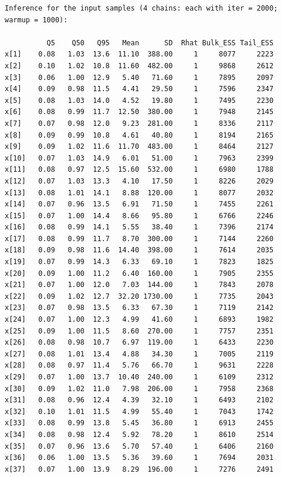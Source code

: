 \documentclass[american,]{article}
\begin{document}
\begin{verbatim}
Inference for the input samples (4 chains: each with iter = 2000; warmup = 1000):

          Q5    Q50   Q95   Mean      SD  Rhat Bulk_ESS Tail_ESS
x[1]    0.08   1.03  13.6  11.10  388.00     1     8077     2223
x[2]    0.10   1.02  10.8  11.60  482.00     1     9868     2612
x[3]    0.06   1.00  12.9   5.40   71.60     1     7895     2097
x[4]    0.09   0.98  11.5   4.41   29.50     1     7596     2347
x[5]    0.08   1.03  14.0   4.52   19.80     1     7495     2230
x[6]    0.08   0.99  11.7  12.50  380.00     1     7948     2145
x[7]    0.07   0.98  12.0   9.23  281.00     1     8336     2117
x[8]    0.09   0.99  10.8   4.61   40.80     1     8194     2165
x[9]    0.09   1.02  11.6  11.70  483.00     1     8464     2127
x[10]   0.07   1.03  14.9   6.01   51.00     1     7963     2399
x[11]   0.08   0.97  12.5  15.60  532.00     1     6980     1788
x[12]   0.07   1.03  13.3   4.10   17.50     1     8226     2029
x[13]   0.08   1.01  14.1   8.88  120.00     1     8077     2032
x[14]   0.07   0.96  13.5   6.91   71.50     1     7455     2261
x[15]   0.07   1.00  14.4   8.66   95.80     1     6766     2246
x[16]   0.08   0.99  14.1   5.55   38.40     1     7396     2174
x[17]   0.08   0.99  11.7   8.70  300.00     1     7144     2260
x[18]   0.09   0.98  11.6  14.40  398.00     1     7614     2035
x[19]   0.07   0.99  14.3   6.33   69.10     1     7823     1825
x[20]   0.09   1.00  11.2   6.40  160.00     1     7905     2355
x[21]   0.07   1.00  12.0   7.03  144.00     1     7843     2078
x[22]   0.09   1.02  12.7  32.20 1730.00     1     7735     2043
x[23]   0.07   0.98  13.5   6.33   67.30     1     7119     2142
x[24]   0.07   1.00  12.3   4.99   41.60     1     6893     1982
x[25]   0.09   1.00  11.5   8.60  270.00     1     7757     2351
x[26]   0.08   0.98  10.7   6.97  119.00     1     6433     2230
x[27]   0.08   1.01  13.4   4.88   34.30     1     7005     2119
x[28]   0.08   0.97  11.4   5.76   66.70     1     9631     2228
x[29]   0.07   1.00  13.7  10.40  240.00     1     6109     2312
x[30]   0.09   1.02  11.0   7.98  206.00     1     7958     2368
x[31]   0.08   0.96  12.4   4.39   32.10     1     6493     2102
x[32]   0.10   1.01  11.5   4.99   55.40     1     7043     1742
x[33]   0.08   0.99  13.8   5.45   36.80     1     6913     2455
x[34]   0.08   0.98  12.4   5.92   78.20     1     8610     2514
x[35]   0.07   0.96  13.6   5.70   57.40     1     6406     2160
x[36]   0.06   1.00  13.5   5.36   39.60     1     7694     2031
x[37]   0.07   1.00  13.9   8.29  196.00     1     7276     2491

\end{verbatim}
\end{document}

